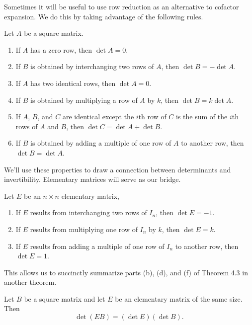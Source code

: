 \documentclass[../m073main.tex]{subfiles}
\begin{document}
Sometimes it will be useful to use row reduction as an alternative to cofactor expansion.
We do this by taking advantage of the following rules.

\begin{theorem}
	Let $A$ be a square matrix.
	\begin{enumerate}[label=(\alph*)]
		\item If $A$ has a zero row, then $\det A = 0$.
		\item If $B$ is obtained by interchanging two rows of $A$, then $\det B = -\det A$.
		\item If $A$ has two identical rows, then $\det A = 0$.
		\item If $B$ is obtained by multiplying a row of $A$ by $k$, then $\det B = k \det A$.
		\item If $A$, $B$, and $C$ are identical except the $i$th row of $C$ is the sum of the $i$th rows of $A$ and $B$, then $\det C = \det A + \det B$.
		\item If $B$ is obtained by adding a multiple of one row of $A$ to another row, then $\det B = \det A$.
	\end{enumerate}
\end{theorem}

We'll use these properties to draw a connection between determinants and invertibility.
Elementary matrices will serve as our bridge.

\begin{theorem}
	Let $E$ be an $n \times n$ elementary matrix,
	\begin{enumerate}[label=(\alph*)]
		\item If $E$ results from interchanging two rows of $I_n$, then $\det E = -1$.
		\item If $E$ results from multiplying one row of $I_n$ by $k$, then $\det E = k$.
		\item If $E$ results from adding a multiple of one row of $I_n$ to another row, then $\det E = 1$.
	\end{enumerate}
\end{theorem}

This allows us to succinctly summarize parts (b), (d), and (f) of Theorem 4.3 in another theorem.

\begin{lemma}
	Let $B$ be a square matrix and let $E$ be an elementary matrix of the same size.
	Then
	\[ \det (EB) = (\det E)(\det B). \]
\end{lemma}
\end{document}
